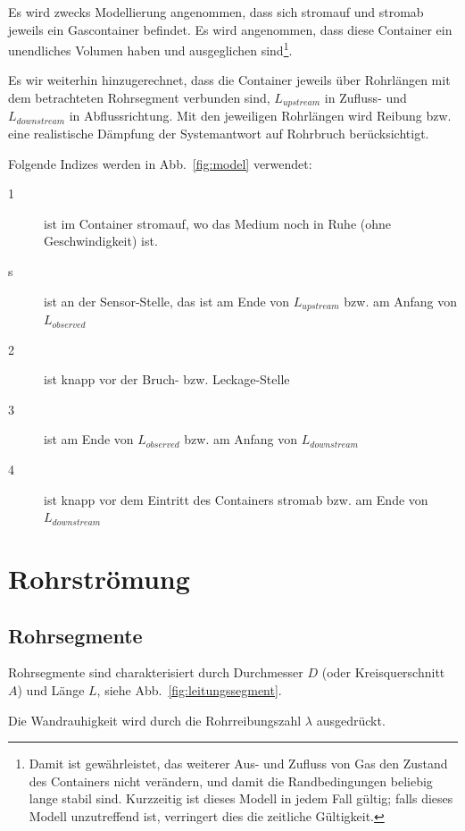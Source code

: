 \documentclass[a4paper,10pt,twocolumn]{article}
\begin{document}
Es wird zwecks Modellierung angenommen, dass sich stromauf und stromab jeweils ein Gascontainer befindet. Es wird angenommen, dass diese Container ein unendliches Volumen haben und ausgeglichen sind\footnote{Damit ist gewährleistet, das weiterer Aus- und Zufluss von Gas den Zustand des Containers nicht verändern, und damit die Randbedingungen beliebig lange stabil sind. Kurzzeitig ist dieses Modell in jedem Fall gültig; falls dieses Modell unzutreffend ist, verringert dies die zeitliche Gültigkeit.}.

Es wir weiterhin hinzugerechnet, dass die Container jeweils über Rohrlängen mit dem betrachteten Rohrsegment verbunden sind, $L_\mathit{upstream}$ in Zufluss- und $L_\mathit{downstream}$ in Abflussrichtung. Mit den jeweiligen Rohrlängen wird Reibung bzw. eine realistische Dämpfung der Systemantwort auf Rohrbruch berücksichtigt.

Folgende Indizes werden in Abb.~\ref{fig:model} verwendet:

\begin{description}
\item[1] ist im Container stromauf, wo das Medium noch in Ruhe (ohne Geschwindigkeit) ist.
\item[s] ist an der Sensor-Stelle, das ist am Ende von $L_\mathit{upstream}$ bzw. am Anfang von $L_\mathit{observed}$
\item[2] ist knapp vor der Bruch- bzw. Leckage-Stelle
\item[3] ist am Ende von $L_\mathit{observed}$ bzw. am Anfang von $L_\mathit{downstream}$
\item[4] ist knapp vor dem Eintritt des Containers stromab bzw. am Ende von $L_\mathit{downstream}$
\end{description}




\appendix

\section{Rohrströmung}

\subsection{Rohrsegmente}

Rohrsegmente sind charakterisiert durch Durchmesser $D$ (oder Kreisquerschnitt $A$) und Länge $L$, siehe Abb.~\ref{fig:leitungssegment}.

Die Wandrauhigkeit wird durch die Rohrreibungszahl $\lambda$ ausgedrückt.
\end{document}
